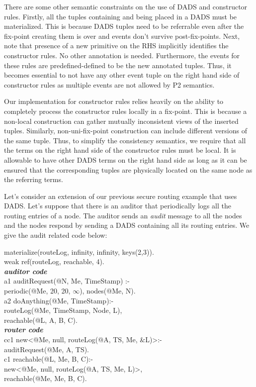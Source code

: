 There are some other semantic constraints on the use of DADS and constructor rules. Firstly, all the tuples containing and being placed in a DADS must be materialized. This is because DADS tuples need to be referrable even after the fix-point creating them is over and events don't survive post-fix-points. Next, note that presence of a new primitive on the RHS implicitly identifies the constructor rules. No other annotation is needed. Furthermore, the events for these rules are predefined-defined to be the new annotated tuples. Thus, it becomes essential to not have any other event tuple on the right hand side of constructor rules as multiple events are not allowed by P2 semantics. 

Our implementation for constructor rules relies heavily on the ability to completely process the constructor rules locally in a fix-point. This is because a non-local construction can gather mutually inconsistent views of the inserted tuples. Similarly, non-uni-fix-point construction can include different versions of the same tuple. Thus, to simplify the consistency semantics, we require that all the terms on the right hand side of the constructor rules must be local. It is allowable to have other DADS terms on the right hand side as long as it can be ensured that the corresponding tuples are physically located on the same node as the referring terms. 

Let's consider an extension of our previous secure routing example that uses DADS. Let's suppose that there is an auditor that periodically logs all the routing entries of a node. The auditor sends an {\em audit} message to all the nodes and the nodes respond by sending a DADS containing all its routing entries. We give the audit related code below:

\begin{code}
materialize(routeLog, infinity, infinity, keys(2,3)).\\
weak ref(routeLog, reachable, 4).\\

{\bf {\em auditor code}}\\
a1 auditRequest(@N, Me, TimeStamp) :-\\
\> periodic(@Me, 20, 20, $\infty$), nodes(@Me, N).\\
a2 doAnything(@Me, TimeStamp):- \\
\> routeLog(@Me, TimeStamp, Node, L), \\
\> reachable(@L, A, B, C).\\

{\bf {\em router code}}\\
cc1 new<@Me, null, routeLog(@A, TS, Me, \&L)>:-\\
\> auditRequest(@Me, A, TS).\\
c1 reachable(@L, Me, B, C):-\\
\> new<@Me, null, routeLog(@A, TS, Me, L)>,\\
\> reachable(@Me, Me, B, C).
\end{code}

